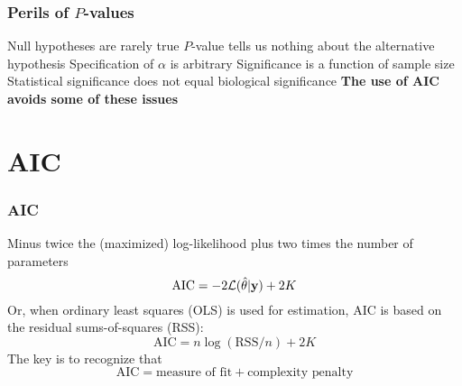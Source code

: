 \documentclass[color=usenames,dvipsnames]{beamer}\usepackage[]{graphicx}\usepackage[]{color}
\begin{document}
\begin{frame}
  \frametitle{Perils of $P$-values}
  \Large
    Null hypotheses are rarely true
    \pause
    \vfill
    $P$-value tells us nothing about the alternative hypothesis
    \pause
    \vfill
    Specification of $\alpha$ is arbitrary
    \pause
    \vfill
    Significance is a function of sample size
    \pause
    \vfill
    Statistical significance does not equal biological significance
  \pause
  \vfill
  \centering \bf
  The use of AIC avoids some of these issues \\
\end{frame}



\section{AIC}




\begin{frame}[fragile]
  \frametitle{AIC}
  \large
  Minus twice the (maximized) log-likelihood plus two times the number of
  parameters
\[
 \mathrm{AIC} = -2\mathcal{L}(\hat{\theta} | {\bf y}) + 2K
\]
  \pause
  Or, when ordinary least squares (OLS) is used for estimation, AIC is
  based on the residual sums-of-squares (RSS):
\[
 \mathrm{AIC} = n\log(\mathrm{RSS}/n) + 2K
\]
 \pause
 The key is to recognize that
\[
 \mathrm{AIC} = \text{measure of fit} + \text{complexity penalty}
\]
\end{frame}
\end{document}

